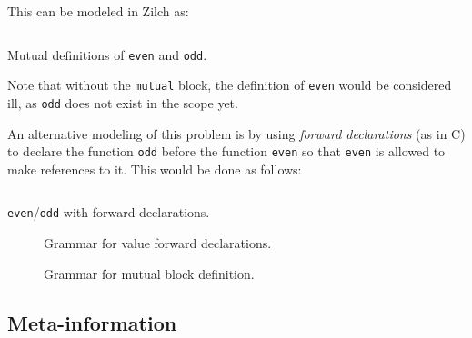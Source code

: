 This can be modeled in Zilch as:
\begin{listing}[H]
	\inputminted{\zilchlexer}{examples/mutual-even-odd.zc}

	\captionsetup{style=invisible}
	\caption{Mutual definitions of \texttt{even} and \texttt{odd}.}
\end{listing}\vspace*{-\baselineskip}
Note that without the \texttt{mutual} block, the definition of \texttt{even} would be considered ill, as \texttt{odd} does not exist in the scope yet.

An alternative modeling of this problem is by using \textit{forward declarations} (as in C) to declare the function \texttt{odd} before the function \texttt{even} so that \texttt{even} is allowed to make references to it.
This would be done as follows:
\begin{listing}[H]
	\inputminted{\zilchlexer}{examples/forwarddecls-even-odd.zc}

	\captionsetup{style=invisible}
	\caption{\texttt{even}/\texttt{odd} with forward declarations.}
\end{listing}
\vspace*{-\baselineskip}

\begin{figure}[H]
	\centering


	\caption{Grammar for value forward declarations.}
	\label{fig:zilch-grammar-declarations-mutual-forwarddecls-grammar}
\end{figure}

\begin{figure}[H]
	\centering


	\caption{Grammar for mutual block definition.}
	\label{fig:zilch-grammar-declarations-mutual-block-grammar}
\end{figure}

\subsection{Meta-information}\label{subsec:zilch-grammar-declarations-meta}

